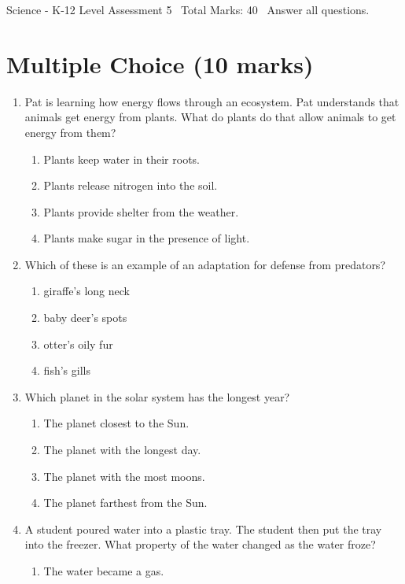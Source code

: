 \documentclass[12pt]{article}
\begin{document}
\begin{center}
Science - K-12 Level Assessment 5 \
Total Marks: 40 \
Answer all questions.
\end{center}

\section*{Multiple Choice (10 marks)}
\begin{enumerate}[label=\arabic*.]
\item Pat is learning how energy flows through an ecosystem. Pat understands that animals get energy from plants. What do plants do that allow animals to get energy from them?
\begin{enumerate}[label=(\alph*)]
    \item Plants keep water in their roots.
    \item Plants release nitrogen into the soil.
    \item Plants provide shelter from the weather.
    \item Plants make sugar in the presence of light.
\end{enumerate}
\item Which of these is an example of an adaptation for defense from predators?
\begin{enumerate}[label=(\alph*)]
    \item giraffe's long neck
    \item baby deer's spots
    \item otter's oily fur
    \item fish's gills
\end{enumerate}
\item Which planet in the solar system has the longest year?
\begin{enumerate}[label=(\alph*)]
    \item The planet closest to the Sun.
    \item The planet with the longest day.
    \item The planet with the most moons.
    \item The planet farthest from the Sun.
\end{enumerate}
\item A student poured water into a plastic tray. The student then put the tray into the freezer. What property of the water changed as the water froze?
\begin{enumerate}[label=(\alph*)]
    \item The water became a gas.

\end{enumerate}
\end{enumerate}
\end{document}
